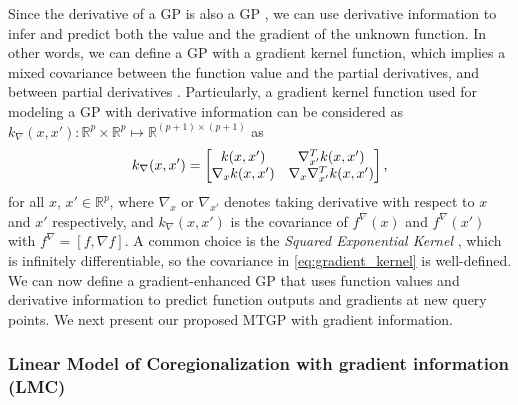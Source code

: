 \documentclass[conference]{IEEEtran}
\newcommand{\AD}[1]{}
\newcommand{\Long}[1]{}
\begin{document}
Since the derivative of a GP is also a GP \cite{williams2006gaussian}, we can use derivative information to infer and predict both the value and the 
gradient of the unknown function. 
In other words, we can define a GP with a gradient kernel function, which implies a mixed covariance between the function value and the partial derivatives, and between partial derivatives 
\cite{bone2025gradient}. Particularly, a gradient kernel function used for modeling a GP with derivative information can be considered as $k_{\nabla}(x,x'):\mathbb{R}^p \times \mathbb{R}^p \mapsto \mathbb{R}^{(p+1) \times (p+1)}$ as 
\begin{equation}
    k_{\nabla}(x,x')= 
    \begin{bmatrix} k(x,x') & \nabla_{x'}^Tk(x,x') \\ \nabla_{x}k(x,x') & \nabla_{x}\nabla_{x'}^Tk(x,x')
    \end{bmatrix} \text,
    \label{eq:gradient_kernel}
\end{equation}
for all $x$, $x' \in \mathbb{R}^p$, where $\nabla_{x}$ or $\nabla_{x'}$ denotes taking derivative 
with respect to $x$ and $x'$ respectively, and $k_{\nabla}(x,x')$ is the covariance of $f^{\nabla}(x)$ and $f^{\nabla}(x')$ with $f^{\nabla} = [f, \nabla f]$. 
A common choice is the \textit{Squared Exponential Kernel} \cite{duvenaud_2014}, which is infinitely differentiable, so the covariance in \eqref{eq:gradient_kernel} is well-defined. 
We can now define a gradient-enhanced GP that uses function values and derivative information to predict function outputs and gradients at new query points. We next present our proposed MTGP with gradient information.

\subsubsection{Linear Model of Coregionalization with gradient information (LMC)}
\end{document}

